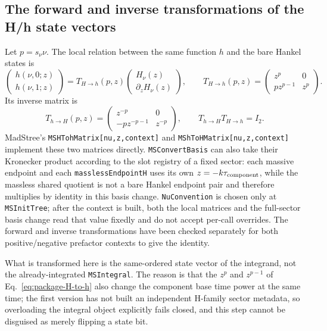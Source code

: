 \documentclass[11pt,a4paper]{article}
\begin{document}
\subsection{The forward and inverse transformations of the H/h state vectors}

Let $p=s_\nu\nu$. The local relation between the same function $h$ and the bare Hankel states is
\begin{equation}
 \begin{pmatrix}h(\nu,0;z)\\h(\nu,1;z)\end{pmatrix}
 =T_{H\to h}(p,z)
 \begin{pmatrix}H_\nu(z)\\\partial_zH_\nu(z)\end{pmatrix},
 \qquad
 T_{H\to h}(p,z)=
 \begin{pmatrix}
  z^p&0\\p z^{p-1}&z^p
 \end{pmatrix}.
 \label{eq:package-H-to-h}
\end{equation}
Its inverse matrix is
\begin{equation}
 T_{h\to H}(p,z)=
 \begin{pmatrix}
  z^{-p}&0\\-p z^{-p-1}&z^{-p}
 \end{pmatrix},
 \qquad
 T_{h\to H}T_{H\to h}=I_2.
 \label{eq:package-h-to-H}
\end{equation}
MadStree's \texttt{MSHTohMatrix[nu,z,context]} and \texttt{MShToHMatrix[nu,z,context]} implement these two matrices directly. \texttt{MSConvertBasis} can also take their Kronecker product according to the slot registry of a fixed sector: each massive endpoint and each \texttt{masslessEndpointH} uses its own $z=-k\tau_{\rm component}$, while the massless shared quotient is not a bare Hankel endpoint pair and therefore multiplies by identity in this basis change. \texttt{NuConvention} is chosen only at \texttt{MSInitTree}; after the context is built, both the local matrices and the full-sector basis change read that value fixedly and do not accept per-call overrides. The forward and inverse transformations have been checked separately for both positive/negative prefactor contexts to give the identity.

What is transformed here is the same-ordered state vector of the integrand, not the already-integrated \texttt{MSIntegral}. The reason is that the $z^p$ and $z^{p-1}$ of Eq.~\eqref{eq:package-H-to-h} also change the component base time power at the same time; the first version has not built an independent H-family sector metadata, so overloading the integral object explicitly fails closed, and this step cannot be disguised as merely flipping a state bit.
\end{document}
